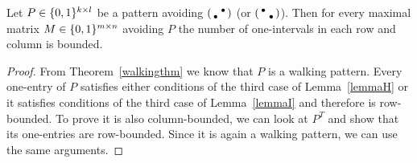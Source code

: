 \begin{lemma}
\label{lemmaWalkPat}
Let $P\in\{0,1\}^{k\times l}$ be a pattern avoiding $\left(\begin{smallmatrix} &\bullet\\\bullet& \end{smallmatrix}\right)$ (or $\left(\begin{smallmatrix}\bullet& \\ &\bullet\end{smallmatrix}\right)$). Then for every maximal matrix $M\in\{0,1\}^{m\times n}$ avoiding $P$ the number of one-intervals in each row and column is bounded.
\end{lemma}
\begin{proof}
From Theorem~\ref{walkingthm} we know that $P$ is a walking pattern. Every one-entry of $P$ satisfies either conditions of the third case of Lemma~\ref{lemmaH} or it satisfies conditions of the third case of Lemma~\ref{lemmaI} and therefore is row-bounded. To prove it is also column-bounded, we can look at $P^T$ and show that its one-entries are row-bounded. Since it is again a walking pattern, we can use the same arguments.
\end{proof}

